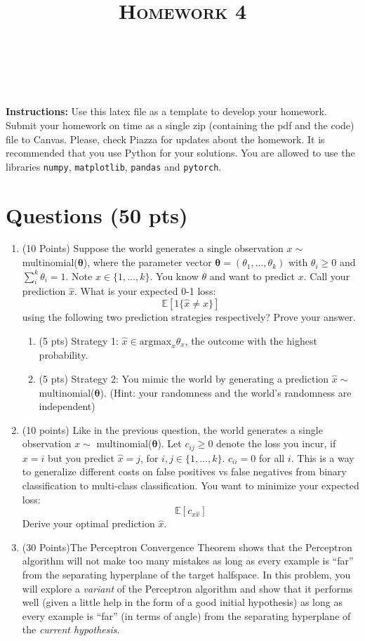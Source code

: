 \documentclass[a4paper]{article}
\title{\textsc{Homework 4}} %
\author{
\red{$>>$NAME HERE$<<$} \\
\red{$>>$ID HERE$<<$}\\
}
\date{}
\theoremstyle{definition}
\renewcommand\vec[1]{\boldsymbol{#1}}
\def\E{\mathbb E}
\begin{document}
\maketitle 


\textbf{Instructions:} 
Use this latex file as a template to develop your homework.
Submit your homework on time as a single zip (containing the pdf and the code) file to Canvas. Please, check Piazza for updates about the homework. It is recommended that you use Python for your solutions. You are allowed to use the libraries {\tt {\tt numpy}}, {\tt matplotlib}, {\tt pandas} and {\tt pytorch}.
\section{Questions (50 pts)}
\begin{enumerate}
\item (10 Points)
Suppose the world generates a single observation $ x\sim$ multinomial($\vec \theta$), where the parameter vector $ \vec \theta = (\theta_1, \ldots , \theta_k)$ with $\theta_i\geq 0$ and $\sum_i^k\theta_i = 1$. Note $x \in \{1, \ldots, k\}$. You know $\theta$ and want to predict $x$. Call your prediction $\hat x$. What is your expected 0-1 loss: 
\[\E[1\{\hat{x} \neq x\}]\] 
using the following two prediction strategies respectively? Prove your answer. 
\begin{enumerate}
    \item (5 pts) Strategy 1: $\hat x \in \mathrm{argmax}_x\theta_x $, the outcome with the highest probability.  
    \item (5 pts) Strategy 2: You mimic the world by generating a prediction $ \hat{x}\sim$ multinomial($\vec \theta$). (Hint: your randomness and the world’s randomness are independent) 
\end{enumerate}

\item (10 points) Like in the previous question, the world generates a single observation $ {x}\sim$ multinomial($\vec \theta$). Let $c_{ij}\geq 0$ denote the loss you incur, if $x = i$ but you predict $\hat x = j$, for $i, j \in \{1, \ldots, k\}$. $c_{ii} = 0$ for all $i$. This is a way to generalize different costs on false positives vs false negatives from binary classification to multi-class classification. You want to minimize your expected loss: 
\[\E[c_{x\hat x}]\] 
Derive your optimal prediction $\hat x$. 

\item (30 Points)The Perceptron Convergence Theorem shows that
the Perceptron algorithm will not make too many mistakes
as long as every example is ``far'' from the separating hyperplane of the target halfspace.
In this problem, you will explore a {\em variant} of the Perceptron algorithm
and show that it performs well (given a little help in the form of a good initial hypothesis)
as long as every example is ``far'' (in terms of angle)
from the separating hyperplane of the \textit{current hypothesis}.


\end{enumerate}
\end{document}
